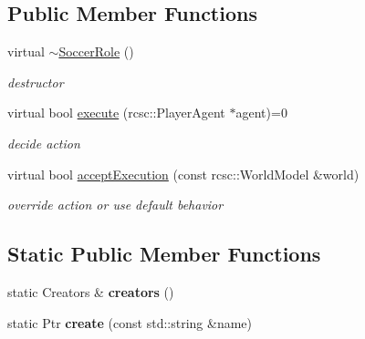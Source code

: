 \subsection*{Public Member Functions}
\begin{DoxyCompactItemize}
\item 
\hypertarget{classSoccerRole_a9af9d00d256d8692dffca4ab4d3edae4}{
virtual \hyperlink{classSoccerRole_a9af9d00d256d8692dffca4ab4d3edae4}{$\sim$SoccerRole} ()}
\label{classSoccerRole_a9af9d00d256d8692dffca4ab4d3edae4}

\begin{DoxyCompactList}\small\item\em destructor \item\end{DoxyCompactList}\item 
\hypertarget{classSoccerRole_a4f04d7b591a6e68f580cb3e199854970}{
virtual bool \hyperlink{classSoccerRole_a4f04d7b591a6e68f580cb3e199854970}{execute} (rcsc::PlayerAgent $\ast$agent)=0}
\label{classSoccerRole_a4f04d7b591a6e68f580cb3e199854970}

\begin{DoxyCompactList}\small\item\em decide action \item\end{DoxyCompactList}\item 
virtual bool \hyperlink{classSoccerRole_ad4a6535ab16a5702939791592134783a}{acceptExecution} (const rcsc::WorldModel \&world)
\begin{DoxyCompactList}\small\item\em override action or use default behavior \item\end{DoxyCompactList}\end{DoxyCompactItemize}
\subsection*{Static Public Member Functions}
\begin{DoxyCompactItemize}
\item 
\hypertarget{classSoccerRole_a87bad2e3271d31ae80891d1c7ccb17b5}{
static Creators \& {\bfseries creators} ()}
\label{classSoccerRole_a87bad2e3271d31ae80891d1c7ccb17b5}

\item 
\hypertarget{classSoccerRole_aed4c3ae8f754b79511e31cb5112a7801}{
static Ptr {\bfseries create} (const std::string \&name)}
\label{classSoccerRole_aed4c3ae8f754b79511e31cb5112a7801}

\end{DoxyCompactItemize}


